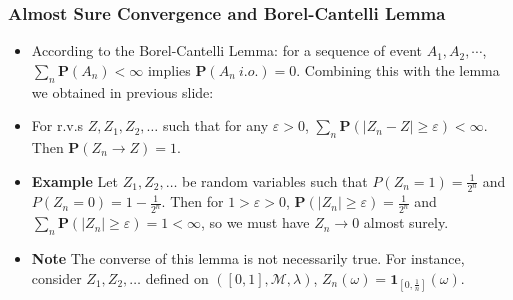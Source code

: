 \documentclass[handout]{beamer}
\newcommand{\BP}{\mathbf{P}}
\newcommand{\BI}{\mathbf{1}}
\begin{document}
\frame
{
  \frametitle{Almost Sure Convergence and Borel-Cantelli Lemma}

   \begin{itemize}
       \item<1-> According to the  Borel-Cantelli Lemma: for a sequence of event $A_1, A_2, \cdots$, $\sum_n \BP(A_n) <\infty$ implies $\BP(A_n \ i.o. )=0$. Combining this with the lemma we obtained in previous slide: 
       
   \item<2->[]     \begin{Lemma} For r.v.s $Z, Z_1, Z_2, \ldots $ such that for any $\varepsilon>0$, $\sum_n \BP(|Z_n-Z| \geq \varepsilon)<\infty$. Then $\BP(Z_n\rightarrow Z)=1$.   \end{Lemma}       

  \item<3-> \textbf{Example} Let $Z_1, Z_2, \ldots$ be random variables such that $P(Z_n=1)=\frac{1}{2^n}$ and $P(Z_n=0)=1-\frac{1}{2^n}$. Then for $1>\varepsilon>0$, $\BP(|Z_n|\geq \varepsilon)=\frac{1}{2^n}$ and $\sum_n \BP(|Z_n|\geq \varepsilon)=1<\infty$, so we must have $Z_n\rightarrow 0$ almost surely. 
  
  
  \item<4-> \textbf{Note}  The converse of this lemma is not necessarily true. For instance, consider $Z_1, Z_2,\ldots$ defined on $([0,1],\mathcal{M}, \lambda)$, $Z_n(\omega)=\BI_{[0,\frac{1}{n}]} (\omega)$.                              
\end{itemize}
}
\end{document}
